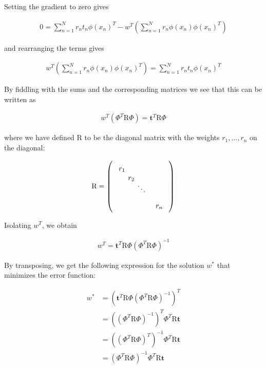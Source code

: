 \documentclass[a4paper]{article}
\begin{document}
Setting the gradient to zero gives

\begin{align*} %
0 = \sum_{n=1}^{N} r_n t_n \phi(x_n)^T - w^T \left( \sum_{n=1}^{N} r_n \phi(x_n) \phi(x_n)^T \right)
\end{align*}

and rearranging the terms gives

\begin{align*} %
w^T \left( \sum_{n=1}^{N} r_n \phi(x_n) \phi(x_n)^T \right) = \sum_{n=1}^{N} r_n t_n \phi(x_n)^T
\end{align*}

By fiddling with the sums and the corresponding matrices we see that this can be written as

\begin{align*} %
w^T \left( \Phi^T \mathrm{R} \Phi \right) = \bm{t}^T \mathrm{R} \Phi
\end{align*}

where we have defined $\mathrm{R}$ to be the diagonal matrix with the weights $r_1, \dots, r_n$ on the diagonal:

\begin{align*} %
\setlength\unitlength{13pt}
\mathrm{R} =
\left(\begin{picture}(6,3)(0,-3)
\put(1,-1){\makebox(0,0){$r_1$}}
\put(2,-2){\makebox(0,0){$r_2$}}
\put(2.8,-2.8){\makebox(0,0){$\cdot$}}
\put(3.1,-3.1){\makebox(0,0){$\cdot$}}
\put(3.4,-3.4){\makebox(0,0){$\cdot$}}
\put(5,-5){\makebox(0,0){$r_n$}}
\end{picture}
\right)
\end{align*}

Isolating $w^T$, we obtain

\begin{align*} %
w^T = \bm{t}^T \mathrm{R} \Phi \left( \Phi^T \mathrm{R} \Phi \right)^{-1}
\end{align*}

By transposing, we get the following expression for the solution $w^*$ that minimizes the error function:

\begin{align*} %
w^* &= \left( \bm{t}^T \mathrm{R} \Phi \left( \Phi^T \mathrm{R} \Phi \right)^{-1} \right) ^T
\\ &= \left( \left( \Phi^T \mathrm{R} \Phi \right)^{-1} \right)^T \Phi^T \mathrm{R} \bm{t}
\\ &= \left( \left( \Phi^T \mathrm{R} \Phi \right)^T \right)^{-1} \Phi^T \mathrm{R} \bm{t}
\\ &= \left( \Phi^T \mathrm{R} \Phi \right)^{-1} \Phi^T \mathrm{R} \bm{t}
\end{align*}
\end{document}
